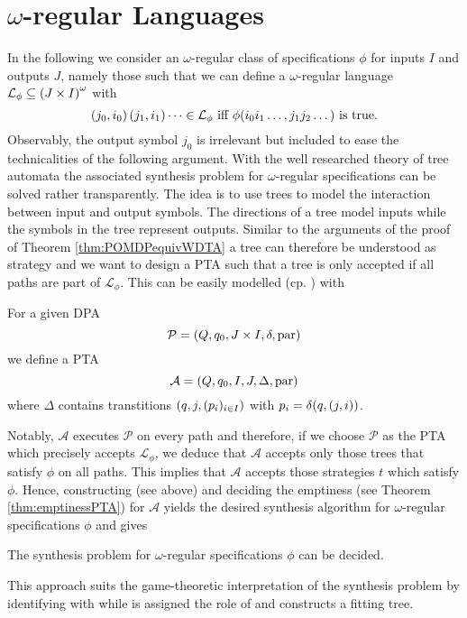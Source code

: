 \section{$\omega$-regular Languages}
In the following we consider an $\omega$-regular class of specifications 
$\phi$ for inputs $I$ and outputs $J$, namely those such that we can define a 
$\omega$-regular language $\mathcal{L}_{\phi}\subseteq 
\left(J\times I\right)^{\omega}$ with
\begin{equation*}
  \left(j_{0}, i_{0}\right)\left(j_{1}, i_{1}\right)\dots\in\mathcal{L}_{\phi}
  \text{ iff }
  \phi(i_{0}i_{1}\dots, j_{1}j_{2}\dots)\text{ is true.}
\end{equation*}
Observably, the output symbol $j_{0}$ is irrelevant but included to ease the 
technicalities of the following argument. With the well researched theory of
tree automata the associated synthesis problem for $\omega$-regular 
specifications can be solved rather transparently. The idea is to use trees to 
model the interaction between input and output symbols. The directions of a 
tree model inputs while the symbols in the tree represent outputs. Similar to 
the arguments of the proof of Theorem \ref{thm:POMDPequivWDTA} a tree can 
therefore be understood as strategy and we want to design a \ac{PTA} such that 
a tree is only accepted if all paths are part of $\mathcal{L}_{\phi}$. This can 
be easily modelled (cp. \cite[Lemma 15]{AutoInfObj}) with
\begin{definition}
  For a given \ac{DPA}
  \begin{equation*}
    \mathcal{P} = \left(Q, q_{0}, J\times I, \delta, \operatorname{par}\right)
  \end{equation*}
  we define a \ac{PTA}
  \begin{equation*}
    \mathcal{A} = \left(Q, q_{0}, I, J, \Delta, \operatorname{par}\right)
  \end{equation*}
  where $\Delta$ contains transtitions $\left(q, j, (p_{i})_{i\in I}\right)$ with
  $p_{i} = \delta(q, \left(j, i\right))$.
\end{definition}
Notably, $\mathcal{A}$ executes $\mathcal{P}$ on every path and therefore, if 
we choose $\mathcal{P}$ as the \ac{PTA} which precisely accepts 
$\mathcal{L}_{\phi}$, we deduce that $\mathcal{A}$ accepts only those trees 
that satisfy $\phi$ on all paths. This implies that $\mathcal{A}$ accepts those
strategies $t$ which satisfy $\phi$. Hence, constructing (see above) and 
deciding the emptiness (see Theorem \ref{thm:emptinessPTA}) for $\mathcal{A}$ 
yields the desired synthesis algorithm for $\omega$-regular specifications 
$\phi$ and gives
\begin{theorem}
  \cite[Theorem 21, Theorem 22]{AutoInfObj}
  The synthesis problem for $\omega$-regular specifications $\phi$ can be 
  decided.
\end{theorem}
This approach suits the game-theoretic interpretation of the synthesis problem
by identifying  with \pathfinder{} while \outputp{} is assigned the 
role of \automaton{} and constructs a fitting tree.

